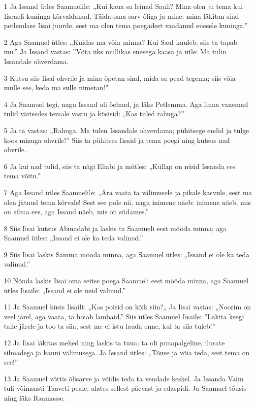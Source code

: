 \par 1 Ja Issand ütles Saamuelile: „Kui kaua sa leinad Sauli? Mina olen ju tema kui Iisraeli kuninga kõrvaldanud. Täida oma sarv õliga ja mine: mina läkitan sind petlemlase Iisai juurde, sest ma olen tema poegadest vaadanud enesele kuninga.”
\par 2 Aga Saamuel ütles: „Kuidas ma võin minna? Kui Saul kuuleb, siis ta tapab mu.” Ja Issand vastas: ”Võta üks mullikas enesega kaasa ja ütle: Ma tulin Issandale ohverdama.
\par 3 Kutsu siis Iisai ohvrile ja mina õpetan sind, mida sa pead tegema; siis võia mulle see, keda ma sulle nimetan!”
\par 4 Ja Saamuel tegi, nagu Issand oli öelnud, ja läks Petlemma. Aga linna vanemad tulid värisedes temale vastu ja küsisid: „Kas tuled rahuga?”
\par 5 Ja ta vastas: „Rahuga. Ma tulen Issandale ohverdama; pühitsege endid ja tulge koos minuga ohvrile!” Siis ta pühitses Iisaid ja tema poegi ning kutsus nad ohvrile.
\par 6 Ja kui nad tulid, siis ta nägi Eliabi ja mõtles: „Küllap on nüüd Issanda ees tema võitu.”
\par 7 Aga Issand ütles Saamuelile: „Ära vaata ta välimusele ja pikale kasvule, sest ma olen jätnud tema kõrvale! Sest see pole nii, nagu inimene näeb: inimene näeb, mis on silma ees, aga Issand näeb, mis on südames.”
\par 8 Siis Iisai kutsus Abinadabi ja laskis ta Saamueli eest mööda minna; aga Saamuel ütles: „Issand ei ole ka teda valinud.”
\par 9 Siis Iisai laskis Samma mööda minna, aga Saamuel ütles: „Issand ei ole ka teda valinud.”
\par 10 Nõnda laskis Iisai oma seitse poega Saamueli eest mööda minna, aga Saamuel ütles Iisaile: „Issand ei ole neid valinud.”
\par 11 Ja Saamuel küsis Iisailt: „Kas poisid on kõik siin?„ Ja Iisai vastas: „Noorim on veel järel, aga vaata, ta hoiab lambaid.” Siis ütles Saamuel Iisaile: ”Läkita keegi talle järele ja too ta siia, sest me ei istu lauda enne, kui ta siia tuleb!”
\par 12 Ja Iisai läkitas mehed ning laskis ta tuua; ta oli punapalgeline, ilusate silmadega ja kauni välimusega. Ja Issand ütles: „Tõuse ja võia teda, sest tema on see!”
\par 13 Ja Saamuel võttis õlisarve ja võidis teda ta vendade keskel. Ja Issanda Vaim tuli võimsasti Taaveti peale, alates sellest päevast ja edaspidi. Ja Saamuel tõusis ning läks Raamasse.
